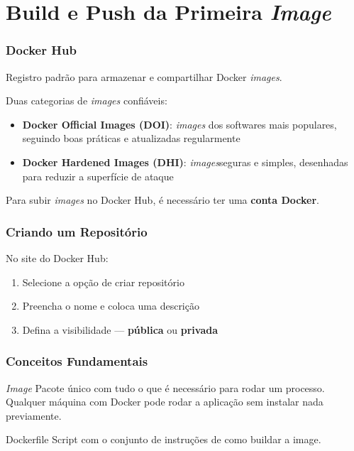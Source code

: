 \section{Build e Push da Primeira \textit{Image}}

\begin{frame}
  \frametitle{Docker Hub}
  Registro padrão para armazenar e compartilhar Docker \textit{images}.

  \vspace{0.5em}
  Duas categorias de \textit{images} confiáveis:
  \begin{itemize}
    \item \textbf{Docker Official Images (DOI)}: \textit{images} dos softwares mais populares, seguindo boas práticas e atualizadas regularmente
    \item \textbf{Docker Hardened Images (DHI)}: \textit{images}seguras e simples, desenhadas para reduzir a superfície de ataque
  \end{itemize}

  \vspace{0.5em}
  Para subir \textit{images} no Docker Hub, é necessário ter uma \textbf{conta Docker}.
\end{frame}

\begin{frame}
  \frametitle{Criando um Repositório}
  No site do Docker Hub:

  \vspace{0.5em}
  \begin{enumerate}
    \item Selecione a opção de criar repositório
    \item Preencha o nome e coloca uma descrição
    \item Defina a visibilidade — \textbf{pública} ou \textbf{privada}
  \end{enumerate}
\end{frame}

\begin{frame}
  \frametitle{Conceitos Fundamentais}
  \begin{block}{\textit{Image}}
    Pacote único com tudo o que é necessário para rodar um processo.
    Qualquer máquina com Docker pode rodar a aplicação sem instalar nada previamente.
  \end{block}

  \vspace{0.5em}
  \begin{block}{Dockerfile}
    Script com o conjunto de instruções de como buildar a image.
  \end{block}
\end{frame}


